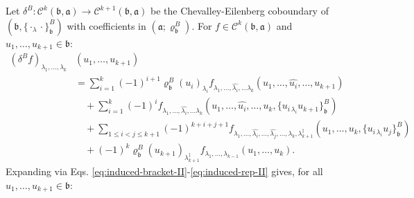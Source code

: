 \documentclass[a4paper,11pt]{article}
\def\Vs{\mathfrak{a}}
\def\Ws{\mathfrak{b}}
\def\rep{\varrho}
\def\Cch{\mathscr{C}}
\def\la{\lambda}
\numberwithin{equation}{section}
\begin{document}
Let $\delta^B:\Cch^k(\Ws,\Vs)\to\Cch^{k+1}(\Ws,\Vs)$ be the
Chevalley-Eilenberg coboundary of $(\Ws,\{\cdot_\la\cdot\}^B_\Ws)$
with coefficients in $(\Vs; \rep^B_\Ws)$.  For $f\in\Cch^k(\Ws,\Vs)$ and
$u_1,\ldots,u_{k+1}\in\Ws$:
\begin{equation}\label{eq:CE-B-II}
\begin{split}
  (\delta^B f)_{\la_1,\ldots,\la_k}
  &(u_1,\ldots,u_{k+1}) \\
  &= \sum_{i=1}^{k}(-1)^{i+1}
     \rep^B_\Ws(u_i)_{\la_i}
     f_{\la_1,\ldots,\widehat{\la_i},\ldots \la_k}(u_1,\ldots,\widehat{u_i},\ldots,u_{k+1})
     \\
  &\quad
    + \sum_{i=1}^{k}(-1)^i
    f_{\la_1,\ldots,\widehat{\la_i},\ldots \la_k}
      (u_1,\ldots,\widehat{u_i},\ldots,u_k,
       \{u_{i\,\la_i} u_{k+1}\}^B_\Ws)
      \\
  &\quad
    + \!\!\sum_{1\leq i<j\leq k+1}\!\!(-1)^{k+i+j+1}
      f_{\la_1,\ldots,\widehat{\la_i},\ldots ,\widehat{\la_j},\ldots, \la_k,\la_{k+1}^\ddag}
      (u_1,\ldots,u_k,\{u_{i\,\la_i}u_j\}^B_\Ws)
      \\
  &\quad
    + (-1)^k\rep^B_\Ws(u_{k+1})_{\la_{k+1}^\ddag}
      f_{\la_1,\ldots,\la_{k-1}}(u_1,\ldots,u_k)
.
\end{split}
\end{equation}
Expanding via Eqs. \eqref{eq:induced-bracket-II}-\eqref{eq:induced-rep-II}
gives, for all $u_1,\ldots,u_{k+1}\in\Ws$:
\end{document}
